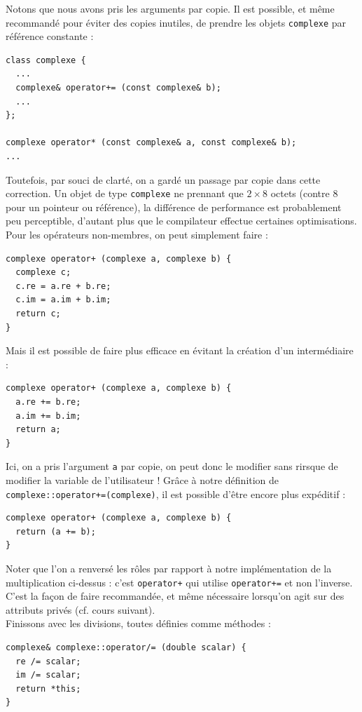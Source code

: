 \documentclass{book}
\newcommand{\inline}[1]{\texttt{#1}}
\begin{document}
\begin{correction}
Notons que nous avons pris les arguments par copie. Il est possible, et même recommandé pour éviter des copies inutiles,  de prendre les objets \inline{complexe} par référence constante :
\begin{verbatim}
class complexe {
  ...
  complexe& operator+= (const complexe& b);
  ...
};

complexe operator* (const complexe& a, const complexe& b);
...
\end{verbatim}
Toutefois, par souci de clarté, on a gardé un passage par copie dans cette correction. Un objet de type \inline{complexe} ne prennant que $2\times 8$ octets (contre $8$ pour un pointeur ou référence), la différence de performance est probablement peu perceptible, d'autant plus que le compilateur effectue certaines optimisations.\\

Pour les opérateurs non-membres, on peut simplement faire :

\begin{verbatim}
complexe operator+ (complexe a, complexe b) {
  complexe c;
  c.re = a.re + b.re;
  c.im = a.im + b.im;
  return c;
}
\end{verbatim}

Mais il est possible de faire plus efficace en évitant la création d'un intermédiaire :

\begin{verbatim}
complexe operator+ (complexe a, complexe b) {
  a.re += b.re;
  a.im += b.im;
  return a;
}
\end{verbatim}

Ici, on a pris l'argument \inline{a} par copie, on peut donc le modifier sans rirsque de modifier la variable de l'utilisateur ! Grâce à notre définition de \inline{complexe::operator+=(complexe)}, il est possible d'être encore plus expéditif :

\begin{verbatim}
complexe operator+ (complexe a, complexe b) {
  return (a += b);
}
\end{verbatim}

Noter que l'on a renversé les rôles par rapport à notre implémentation de la multiplication ci-dessus : c'est \inline{operator+} qui utilise \inline{operator+=} et non l'inverse. C'est la façon de faire recommandée, et même nécessaire lorsqu'on agit sur des attributs privés (cf. cours suivant).\\

Finissons avec les divisions, toutes définies comme méthodes :
\begin{verbatim}
complexe& complexe::operator/= (double scalar) {
  re /= scalar;
  im /= scalar;
  return *this;
}


\end{verbatim}
\end{correction}
\end{document}
